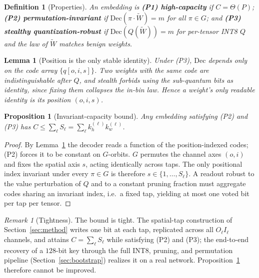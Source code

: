 \documentclass[10pt,journal]{IEEEtran}
\newtheorem{definition}{Definition}
\newtheorem{lemma}{Lemma}
\newtheorem{proposition}{Proposition}
\theoremstyle{remark}
\newtheorem{remark}{Remark}
\begin{document}
\begin{definition}[Properties]\label{def:props}
An embedding is \textbf{(P1) high-capacity} if $C=\Theta(P)$; \textbf{(P2)
permutation-invariant} if $\mathrm{Dec}(\pi\!\cdot\!\tilde W)=m$ for all $\pi\in G$; and
\textbf{(P3) stealthy quantization-robust} if $\mathrm{Dec}(Q(\tilde W))=m$ for
per-tensor INT8 $Q$ and the law of $\tilde W$ matches benign weights.
\end{definition}

\begin{lemma}[Position is the only stable identity]\label{lem:pos}
Under \textup{(P3)}, $\mathrm{Dec}$ depends only on the code array $\{q[o,i,s]\}$.
Two weights with the same code are indistinguishable after $Q$, and stealth forbids
using the sub-quantum bits as identity, since fixing them collapses the in-bin law.
Hence a weight's only readable identity is its position $(o,i,s)$.
\end{lemma}

\begin{proposition}[Invariant-capacity bound]\label{prop:bound}
Any embedding satisfying \textup{(P2)} and \textup{(P3)} has
$C\le\sum_{\ell} S_\ell=\sum_\ell k_h^{(\ell)}k_w^{(\ell)}$.
\end{proposition}
\begin{proof}
By Lemma~\ref{lem:pos} the decoder reads a function of the position-indexed codes;
(P2) forces it to be constant on $G$-orbits. $G$ permutes the channel axes $(o,i)$ and
fixes the spatial axis $s$, acting identically across taps. The only positional index
invariant under every $\pi\in G$ is therefore $s\in\{1,\dots,S_\ell\}$. A readout
robust to the value perturbation of $Q$ and to a constant pruning fraction must
aggregate codes sharing an invariant index, i.e.\ a fixed tap, yielding at most one
voted bit per tap per tensor.
\end{proof}

\begin{remark}[Tightness]\label{rem:tight}
The bound is tight. The spatial-tap construction of Section~\ref{sec:method} writes one
bit at each tap, replicated across all $O_\ell I_\ell$ channels, and attains
$C=\sum_\ell S_\ell$ while satisfying (P2) and (P3); the end-to-end recovery of a
$128$-bit key through the full INT8, pruning, and permutation pipeline
(Section~\ref{sec:bootstrap}) realizes it on a real network. Proposition~\ref{prop:bound}
therefore cannot be improved.
\end{remark}
\end{document}
